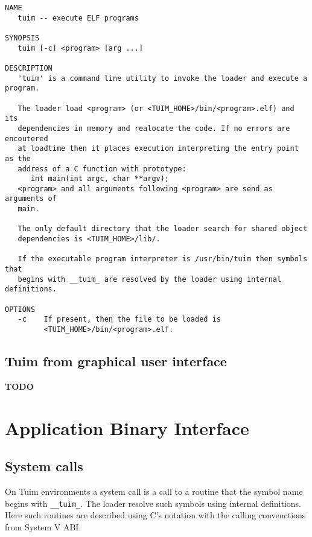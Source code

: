 \documentclass[
   12pt,                         %
   openright,                    %
   twoside,                      %
   a4paper,                      %
   sumario = tradicional,        %
   english,                      %
   xcolor=table                  %
]{abntex2}
\begin{document}
\begin{verbatim}
NAME
   tuim -- execute ELF programs

SYNOPSIS
   tuim [-c] <program> [arg ...]

DESCRIPTION
   'tuim' is a command line utility to invoke the loader and execute a program.

   The loader load <program> (or <TUIM_HOME>/bin/<program>.elf) and its
   dependencies in memory and realocate the code. If no errors are encoutered
   at loadtime then it places execution interpreting the entry point as the
   address of a C function with prototype:
      int main(int argc, char **argv);
   <program> and all arguments following <program> are send as arguments of
   main.
   
   The only default directory that the loader search for shared object
   dependencies is <TUIM_HOME>/lib/.

   If the executable program interpreter is /usr/bin/tuim then symbols that
   begins with __tuim_ are resolved by the loader using internal definitions.

OPTIONS
   -c    If present, then the file to be loaded is
         <TUIM_HOME>/bin/<program>.elf.
\end{verbatim}

\chapter{Tuim from graphical user interface}

\textbf{TODO}

\part{Application Binary Interface}

\chapter{System calls}

On Tuim environments a system call is a call to a routine
that the symbol name begins with \texttt{\_\_tuim\_}.
The loader resolve such symbols using internal definitions.
Here such routines are described using C's notation with the
calling convenctions from System V ABI.

\newpage
\end{document}
